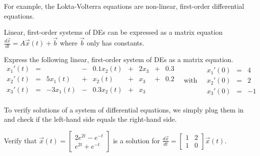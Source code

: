 \documentclass[../main.tex]{subfiles}
\begin{document}
For example, the Lokta-Volterra equations are non-linear, first-order differential equations.
\clearpage

Linear, first-order systems of DEs can be expressed as a matrix equation \(\frac{d \vec{x}}{dt} = A \vec{x}(t) + \vec{b}\) where \(\vec{b}\) only has constants.

\begin{example}
  Express the following linear, first-order system of DEs as a matrix equation.
  \[
     \begin{array}{rcrcrcrcr}
       x_{1}'(t) &=&              &-& 0.1 x_{2}(t) &+& 2 x_{3} &+& 0.3\\
       x_{2}'(t) &=&   5 x_{1}(t) &+&     x_{2}(t) &+&   x_{3} &+& 0.2 \\
       x_{3}'(t) &=&  -3 x_{1}(t) &-& 0.3 x_{2}(t) &+&   x_{3} \\
     \end{array}
     \quad\text{with}\quad
     \begin{array}{rcr}
      x_{1}'(0) &=& 4 \\
      x_{2}'(0) &=& 2 \\
      x_{3}'(0) &=& -1
     \end{array}
  \]

\end{example}

To verify solutions of a system of differential equations, we simply plug them in and check if the left-hand side equals the right-hand side.
\begin{example}
  Verify that \(\vec{x}(t) = \begin{bmatrix} 2 e^{2t} - e^{-t} \\ e^{2t} + e^{-t} \end{bmatrix}\) is a solution for \(\frac{d\vec{x}}{dt} = \begin{bmatrix} 1 & 2 \\ 1 & 0 \end{bmatrix} \vec{x}(t)\).
\end{example}

\end{document}
